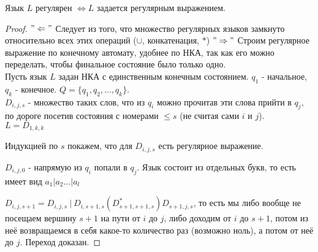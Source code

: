 \begin{theorem}
    Язык $L$ регулярен $\Leftrightarrow L$ задается регулярным выражением.
\end{theorem}

\begin{proof}
    $"\Leftarrow"$ Следует из того, что множество регулярных языков замкнуто относительно всех этих операций ($\cup$, конкатенация, $*$)
    $"\Rightarrow"$ Строим регулярное выражение по конечному автомату, удобнее по НКА, так как его можно переделать, чтобы финальное состояние было только одно.\\
    Пусть язык $L$ задан НКА с единственным конечным состоянием. $q_1$ - начальное, $q_k$ - конечное. $Q = \{q_1, q_2, \dots, q_k\}$.\\
    $D_{i,j,s}$ - множество таких слов, что из $q_i$ можно прочитав эти слова прийти в $q_j$, по дороге посетив состояния с номерами $\leq s$ (не считая сами $i$ и $j$).\\

    $L = D_{1, k, k}$

    Индукцией по $s$ покажем, что для $D_{i,j,s}$ есть регулярное выражение.

    $D_{i,j,0}$ - напрямую из $q_i$ попали в $q_j$. Язык состоит из отдельных букв, то есть имеет вид $a_1 | a_2 \dots | a_l$

    $D_{i, j, s+1} = D_{i, j, s}\ |\ D_{i, s+1, s}(D_{s+1, s+1, s}^*)D_{s+1, j, s}$, то есть мы либо вообще не посещаем вершину $s+1$ на пути от $i$ до $j$, либо доходим от $i$ до $s+1$, потом из неё возвращаемся в себя какое-то количество раз (возможно ноль), а потом от неё до $j$. Переход доказан.
    
\end{proof}

